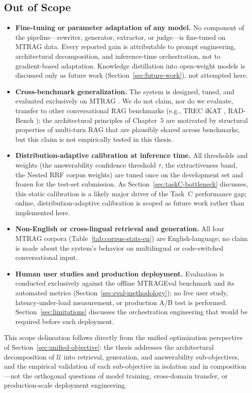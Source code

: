 \subsection{Out of Scope}

\begin{itemize}
    \item \textbf{Fine-tuning or parameter adaptation of any model.} No component of the pipeline---rewriter, generator, extractor, or judge---is fine-tuned on MTRAG data. Every reported gain is attributable to prompt engineering, architectural decomposition, and inference-time orchestration, not to gradient-based adaptation. Knowledge distillation into open-weight models is discussed only as future work (Section~\ref{sec:future-work}), not attempted here.
    \item \textbf{Cross-benchmark generalization.} The system is designed, tuned, and evaluated exclusively on MTRAG \citep{katsis2025mtrag}. We do not claim, nor do we evaluate, transfer to other conversational RAG benchmarks (e.g., TREC iKAT \citep{aliannejadi2024trec}, RAD-Bench \citep{kuo2025radbench}); the architectural principles of Chapter~5 are motivated by structural properties of multi-turn RAG that are plausibly shared across benchmarks, but this claim is not empirically tested in this thesis.
    \item \textbf{Distribution-adaptive calibration at inference time.} All thresholds and weights (the answerability confidence threshold $\tau$, the extractiveness band, the Nested RRF corpus weights) are tuned once on the development set and frozen for the test-set submission. As Section~\ref{sec:taskC-bottleneck} discusses, this static calibration is a likely major driver of the Task~C performance gap; online, distribution-adaptive calibration is scoped as future work rather than implemented here.
    \item \textbf{Non-English or cross-lingual retrieval and generation.} All four MTRAG corpora (Table~\ref{tab:corpus-stats-en}) are English-language; no claim is made about the system's behavior on multilingual or code-switched conversational input.
    \item \textbf{Human user studies and production deployment.} Evaluation is conducted exclusively against the offline MTRAGEval benchmark and its automated metrics (Section~\ref{sec:eval-methodology}); no live user study, latency-under-load measurement, or production A/B test is performed. Section~\ref{sec:limitations} discusses the orchestration engineering that would be required before such deployment.
\end{itemize}

This scope delineation follows directly from the unified optimization perspective of Section~\ref{sec:unified-objective}: the thesis addresses the architectural decomposition of $\mathcal{U}$ into retrieval, generation, and answerability sub-objectives, and the empirical validation of each sub-objective in isolation and in composition---not the orthogonal questions of model training, cross-domain transfer, or production-scale deployment engineering.
